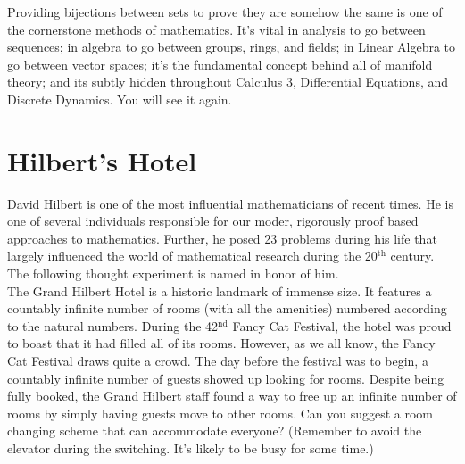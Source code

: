 \documentclass[12 pt]{article}
\theoremstyle{definition}
\theoremstyle{plain}
\theoremstyle{mytheorem}
\theoremstyle{myexample}
\theoremstyle{mydefinition}
\begin{document}
Providing bijections between sets to prove they are somehow the same is one of the cornerstone methods of mathematics.  It's vital in analysis to go between sequences; in algebra to go between groups, rings, and fields; in Linear Algebra to go between vector spaces; it's the fundamental concept behind all of manifold theory; and its subtly hidden throughout Calculus 3, Differential Equations, and Discrete Dynamics.  You will see it again.

\section{Hilbert's Hotel}

David Hilbert is one of the most influential mathematicians of recent times.  He is one of several individuals responsible for our moder, rigorously proof based approaches to mathematics.  Further, he posed 23 problems during his life that largely influenced the world of mathematical research during the 20$^{\text{th}}$ century.  The following thought experiment is named in honor of him.  \\

The Grand Hilbert Hotel is a historic landmark of immense size.  It features a countably infinite number of rooms (with all the amenities) numbered according to the natural numbers.  During the 42$^{\text{nd}}$ Fancy Cat Festival, the hotel was proud to boast that it had filled all of its rooms.  However, as we all know, the Fancy Cat Festival draws quite a crowd.  The day before the festival was to begin, a countably infinite number of guests showed up looking for rooms.  Despite being fully booked, the Grand Hilbert staff found a way to free up an infinite number of rooms by simply having guests move to other rooms.  Can you suggest a room changing scheme that can accommodate everyone?  (Remember to avoid the elevator during the switching.  It's likely to be busy for some time.)
\end{document}
